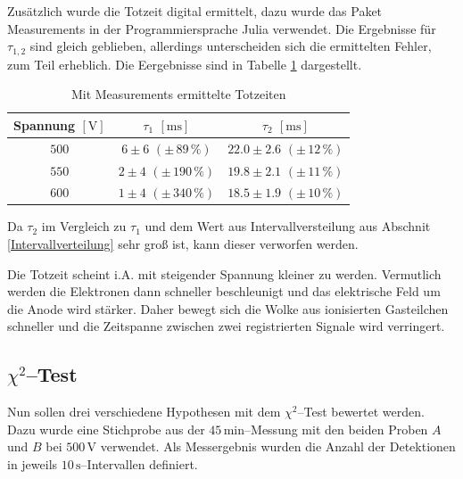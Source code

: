 \documentclass[12pt,a4paper]{scrartcl}
\numberwithin{equation}{section} %
\newcommand{\code}[1]{\textsf{#1}}
\renewcommand{\[}{} %
\renewcommand{\]}{\noindent} %
\begin{document}
\noindent
Zusätzlich wurde die Totzeit digital ermittelt, dazu wurde das Paket \code{Measurements} in der Programmiersprache \code{Julia} verwendet. \cite{Julia:Measurements} Die Ergebnisse für $\tau _{1,2}$ sind gleich geblieben, allerdings unterscheiden sich die ermittelten Fehler, zum Teil erheblich. Die Eergebnisse sind in Tabelle \ref{tab:Totzeit m. Julia} dargestellt.

\begin{table}[h!]
	\centering
	\begin{tabular}[h]{c|c|c}
		Spannung $[\mathrm V]$
			& $\tau_1$ $[\mathrm{ms}]$
			& $\tau_2$ $[\mathrm{ms}]$ \\
		\hline
		$500$ & $6 \pm 6$ $(\pm\, 89\,\%)$ & $22.0 \pm 2.6$ $(\pm\, 12\,\%)$  \\
		$550$ & $2 \pm 4$ $(\pm\, 190\,\%)$ & $19.8 \pm 2.1$ $(\pm\, 11\,\%)$ \\
		$600$ & $1 \pm 4$ $(\pm\, 340\,\%)$ & $18.5 \pm 1.9$ $(\pm\, 10\,\%)$ \\
	\end{tabular}
	\caption{Mit \code{Measurements} \cite{Julia:Measurements} ermittelte Totzeiten}
	\label{tab:Totzeit m. Julia}
\end{table}

\noindent
Da $\tau _2$ im Vergleich zu $\tau _1$ und dem Wert aus Intervallversteilung aus Abschnit \ref{Intervallverteilung} sehr groß ist, kann dieser verworfen werden.

Die Totzeit scheint i.A. mit steigender Spannung kleiner zu werden. Vermutlich werden die Elektronen dann schneller beschleunigt und das elektrische Feld um die Anode wird stärker. Daher bewegt sich die Wolke aus ionisierten Gasteilchen schneller und die Zeitspanne zwischen zwei registrierten Signale wird verringert.

\hypertarget{chi2test}{\subsection{$\chi^2$--Test}\label{chi2test}}

Nun sollen drei verschiedene Hypothesen mit dem $\chi^2$--Test bewertet werden. Dazu wurde eine Stichprobe aus der $45\mathrm{\,min}$--Messung mit den beiden Proben $A$ und $B$ bei $500\mathrm{\,V}$ verwendet. Als Messergebnis wurden die Anzahl der Detektionen in jeweils $10\mathrm{\,s}$--Intervallen definiert.
\end{document}
